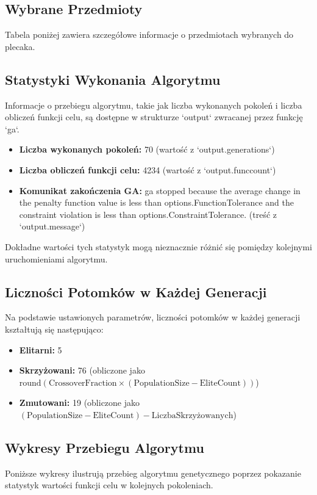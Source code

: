 \documentclass[a4paper, 11pt]{article}
\begin{document}
\subsection{Wybrane Przedmioty}
Tabela poniżej zawiera szczegółowe informacje o przedmiotach wybranych do plecaka.


\subsection{Statystyki Wykonania Algorytmu}
Informacje o przebiegu algorytmu, takie jak liczba wykonanych pokoleń i liczba obliczeń funkcji celu, są dostępne w strukturze `output` zwracanej przez funkcję `ga`.
\begin{itemize}
    \item \textbf{Liczba wykonanych pokoleń:} 70 (wartość z `output.generations`)
    \item \textbf{Liczba obliczeń funkcji celu:} 4234 (wartość z `output.funccount`)
    \item \textbf{Komunikat zakończenia GA:} ga stopped because the average change in the penalty function value is less than options.FunctionTolerance and the constraint violation is less than options.ConstraintTolerance. (treść z `output.message`)
\end{itemize}
Dokładne wartości tych statystyk mogą nieznacznie różnić się pomiędzy kolejnymi uruchomieniami algorytmu.

\subsection{Liczności Potomków w Każdej Generacji}
Na podstawie ustawionych parametrów, liczności potomków w każdej generacji kształtują się następująco:
\begin{itemize}
    \item \textbf{Elitarni:} 5
    \item \textbf{Skrzyżowani:} 76 (obliczone jako $\text{round}(\text{CrossoverFraction} \times (\text{PopulationSize} - \text{EliteCount}))$)
    \item \textbf{Zmutowani:} 19 (obliczone jako $(\text{PopulationSize} - \text{EliteCount}) - \text{LiczbaSkrzyżowanych}$)
\end{itemize}

\subsection{Wykresy Przebiegu Algorytmu}
Poniższe wykresy ilustrują przebieg algorytmu genetycznego poprzez pokazanie statystyk wartości funkcji celu w kolejnych pokoleniach.
\end{document}
